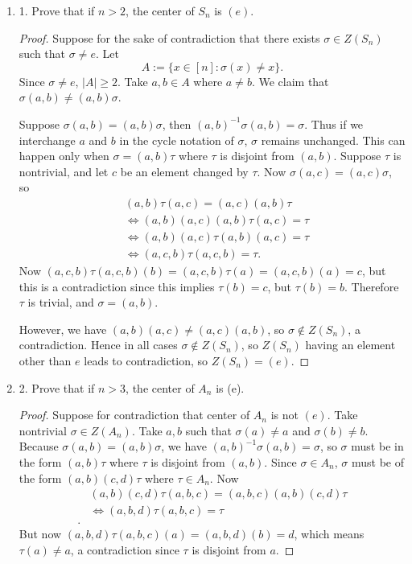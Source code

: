 \begin{enumerate}[resume]
	\item 1. Prove that if $n>2$, the center of $S_n$ is $(e)$.
\begin{proof}
	Suppose for the sake of contradiction that there exists  $\sigma \in Z(S_n)$ such that $\sigma\neq e$. Let \[
		A := \{x \in [n]: \sigma(x) \neq  x\} 
	.\] 
	Since $\sigma\neq e$, $|A| \ge 2$. Take $a, b \in A$ where $a \neq b$. We claim that $\sigma(a,b) \neq (a,b)\sigma$. 

	Suppose $\sigma(a,b) = (a,b)\sigma$, then $(a,b)^{-1} \sigma (a,b) = \sigma$. Thus if we interchange $a$ and $b$ in the cycle notation of $\sigma$, $\sigma$ remains unchanged. This can happen only when $\sigma = (a,b)\tau$ where $\tau$ is disjoint from $(a,b)$. Suppose $\tau$ is nontrivial, and let $c$ be an element changed by $\tau$. Now $\sigma(a,c) = (a,c) \sigma$, so
	\begin{align*}
		&(a,b)\tau(a,c) = (a,c)(a,b)\tau\\
		&\iff (a,b)(a,c)(a,b)\tau(a,c) = \tau \\
		&\iff (a,b)(a,c)\tau(a,b) (a,c) = \tau \\
		&\iff (a,c,b)\tau(a,c,b) = \tau
	.\end{align*}
	Now $(a,c,b)\tau(a,c,b)(b) =  (a,c,b)\tau(a) = (a,c,b)(a) = c$, but this is a contradiction since this implies $\tau(b) = c$, but $\tau(b) = b$. Therefore $\tau$ is trivial, and $\sigma = (a,b)$.

	However, we have $(a,b)(a,c) \neq (a,c)(a,b)$, so $\sigma \not\in Z(S_n)$, a contradiction. Hence in all cases $\sigma \not\in Z(S_n)$, so $Z(S_n)$ having an element other than $e$ leads to contradiction, so $Z(S_n) = (e)$.
\end{proof}

	\item 2. Prove that if $n>3$, the center of $A_n$ is (e).
\begin{proof}
	Suppose for contradiction that center of $A_n$ is not $(e)$. Take nontrivial $\sigma \in Z(A_n)$. Take  $a,b$ such that $\sigma(a)\neq a$ and $\sigma(b)\neq b$. Because {\color{red}$\sigma(a,b) = (a,b)\sigma$}, we have  $(a,b)^{-1}\sigma(a,b) = \sigma$, so $\sigma$ must be in the form $(a,b)\tau$ where $\tau$ is disjoint from $(a,b)$. Since $\sigma \in A_n$, $\sigma$ must be of the form $(a,b)(c,d)\tau$ where $\tau \in A_n$. Now
	\begin{align*}
		&(a,b)(c,d)\tau(a,b,c) = (a,b,c)(a,b)(c,d)\tau\\
		&\iff (a,b,d)\tau(a,b,c) = \tau \\
	.\end{align*}
	But now $(a,b,d)\tau(a,b,c)(a) = (a,b,d)(b) = d$, which means $\tau(a)\neq a$, a contradiction since $\tau$ is disjoint from $a $.


\end{proof}
\end{enumerate}
